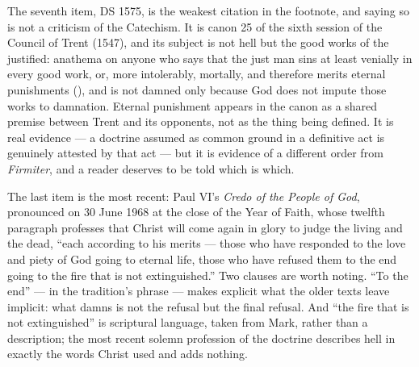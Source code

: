 The seventh item, DS 1575, is the weakest citation in the footnote, and saying so is not a criticism of the Catechism. It is canon 25 of the sixth session of the Council of Trent (1547), and its subject is not hell but the good works of the justified: anathema on anyone who says that the just man sins at least venially in every good work, or, more intolerably, mortally, and therefore merits eternal punishments (), and is not damned only because God does not impute those works to damnation. Eternal punishment appears in the canon as a shared premise between Trent and its opponents, not as the thing being defined. It is real evidence --- a doctrine assumed as common ground in a definitive act is genuinely attested by that act --- but it is evidence of a different order from \emph{Firmiter}, and a reader deserves to be told which is which.

The last item is the most recent: Paul VI's \emph{Credo of the People of God}, pronounced on 30 June 1968 at the close of the Year of Faith, whose twelfth paragraph professes that Christ will come again in glory to judge the living and the dead, ``each according to his merits --- those who have responded to the love and piety of God going to eternal life, those who have refused them to the end going to the fire that is not extinguished.'' Two clauses are worth noting. ``To the end'' ---  in the tradition's phrase --- makes explicit what the older texts leave implicit: what damns is not the refusal but the final refusal. And ``the fire that is not extinguished'' is scriptural language, taken from Mark, rather than a description; the most recent solemn profession of the doctrine describes hell in exactly the words Christ used and adds nothing.

